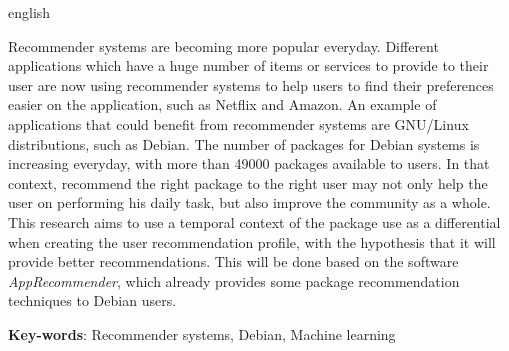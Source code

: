 \begin{resumo}[Abstract]
 \begin{otherlanguage*}{english}

   Recommender systems are becoming more popular everyday. Different
   applications which have a huge number of items or services to provide
   to their user are now using recommender systems to help users
   to find their preferences easier on the application, such as Netflix and
   Amazon. An example of applications that could benefit from recommender
   systems are GNU/Linux distributions, such as Debian. The number of
   packages for Debian systems is increasing
   everyday, with more than 49000 packages
   available to users. In that context, recommend the right package
   to the right user may not only help the user on
   performing his daily task, but also improve the community as a whole.
   This research aims to use a temporal context of the package use as a
   differential when creating the user recommendation profile, with
   the hypothesis that it will provide better recommendations. This
   will be done based on the software \textit{AppRecommender}, which
   already provides some package recommendation techniques to
   Debian users.

   \vspace{\onelineskip}
 
   \noindent 
   \textbf{Key-words}: Recommender systems, Debian, Machine learning
 \end{otherlanguage*}
\end{resumo}
